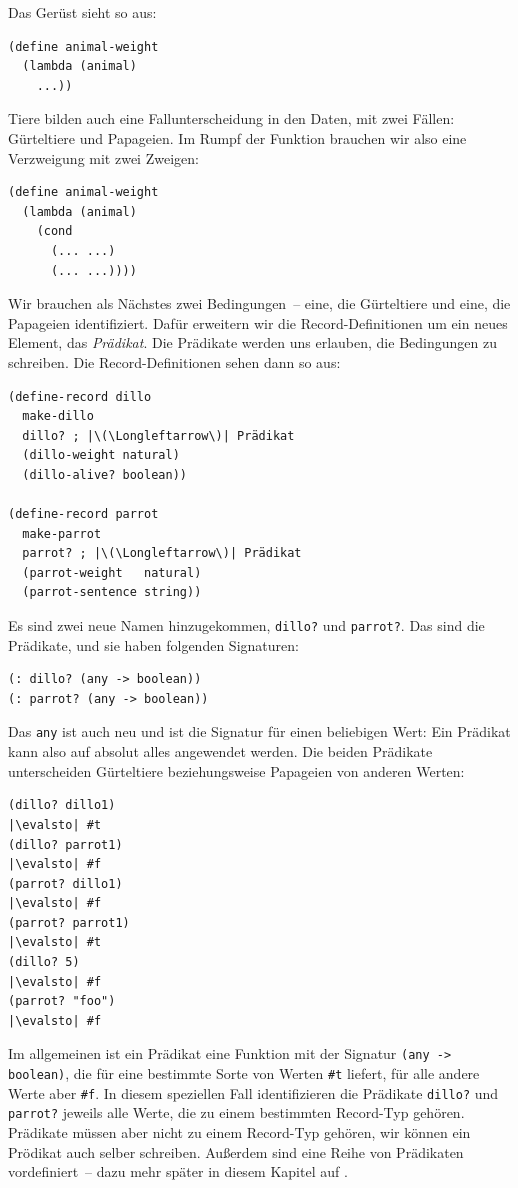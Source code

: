 %
Das Gerüst sieht so aus:
%
\begin{lstlisting}
(define animal-weight
  (lambda (animal)
    ...))
\end{lstlisting}
%
Tiere bilden auch eine Fallunterscheidung in den Daten, mit zwei
Fällen: Gürteltiere und Papageien.  Im Rumpf der Funktion brauchen wir
also eine Verzweigung mit zwei Zweigen:
%
\begin{lstlisting}
(define animal-weight
  (lambda (animal)
    (cond
      (... ...)
      (... ...))))
\end{lstlisting}
%
Wir brauchen als Nächstes zwei Bedingungen~-- eine, die Gürteltiere
und eine, die Papageien identifiziert.  Dafür erweitern wir die
Record-Definitionen um ein neues Element, das \textit{Prädikat}.
Die Prädikate werden uns erlauben, die Bedingungen zu
schreiben.  Die Record-Definitionen sehen dann so aus:
%
\begin{lstlisting}
(define-record dillo
  make-dillo
  dillo? ; |\(\Longleftarrow\)| Prädikat
  (dillo-weight natural)
  (dillo-alive? boolean))

(define-record parrot
  make-parrot
  parrot? ; |\(\Longleftarrow\)| Prädikat
  (parrot-weight   natural)
  (parrot-sentence string))
\end{lstlisting}
%
Es sind zwei neue Namen hinzugekommen, \lstinline{dillo?} und
\lstinline{parrot?}. Das sind die Prädikate, und sie haben folgenden
Signaturen:
%
\begin{lstlisting}
(: dillo? (any -> boolean))
(: parrot? (any -> boolean))
\end{lstlisting}
%
Das \lstinline{any} ist auch neu und ist die Signatur für einen
beliebigen Wert: Ein Prädikat kann also auf absolut alles angewendet
werden.  Die beiden Prädikate unterscheiden Gürteltiere
beziehungsweise Papageien von anderen Werten:
%
\begin{lstlisting}
(dillo? dillo1)
|\evalsto| #t
(dillo? parrot1)
|\evalsto| #f
(parrot? dillo1)
|\evalsto| #f
(parrot? parrot1)
|\evalsto| #t
(dillo? 5)
|\evalsto| #f
(parrot? "foo")
|\evalsto| #f
\end{lstlisting}
%
Im allgemeinen ist ein Prädikat eine Funktion mit der Signatur
\lstinline{(any -> boolean)}, die für eine bestimmte Sorte von Werten
\lstinline{#t} liefert, für alle andere Werte aber \lstinline{#f}.  In
diesem speziellen Fall identifizieren die Prädikate \lstinline{dillo?}
und \lstinline{parrot?} jeweils alle Werte, die zu einem bestimmten
Record-Typ gehören.  Prädikate müssen aber nicht zu einem Record-Typ
gehören, wir können ein Prödikat auch selber schreiben.  Außerdem sind
eine Reihe von Prädikaten vordefiniert~-- dazu mehr später in diesem
Kapitel auf \pageref{scheme:predicates}.

